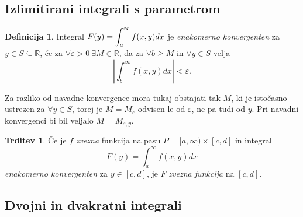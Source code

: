 \documentclass[11pt]{article}
\theoremstyle{definition}
\newtheorem{definicija}{Definicija}[section]
\theoremstyle{definition}
\newtheorem{trditev}{Trditev}[section]
\theoremstyle{definition}
\begin{document}

\subsection{Izlimitirani integrali s parametrom}
\vspace{0.5cm}

\begin{definicija}

Integral $F(y) = \mathlarger{\int_{a}^{\infty} f(x, y) dx}$ je \textit{enakomerno konvergenten} za $y \in S \subseteq \mathbb{R}$, če za $\forall \varepsilon > 0 ~\exists M \in \mathbb{R}$, da za $\forall b \geq M$ in $\forall y \in S$ velja
$$\left| \int_{b}^{\infty} f(x, y) dx \right| < \varepsilon.$$ 

Za razliko od navadne konvergence mora tukaj obstajati tak $M$, ki je istočasno ustrezen za $\forall y \in S$, torej je $M = M_{\varepsilon}$ odvisen le od $\varepsilon$, ne pa tudi od $y$. Pri navadni konvergenci bi bil veljalo $M = M_{\varepsilon,y}$.

\end{definicija}
\vspace{0.5cm}

\begin{trditev}

Če je $f$ \textit{zvezna} funkcija na pasu $P = [a, \infty) \times [c, d]$ in integral
$$F(y) = \int_{a}^{\infty} f(x, y) dx$$
\textit{enakomerno konvergenten} za $y \in [c, d]$, je $F$ \textit{zvezna funkcija} na $[c, d]$.

\end{trditev}
\vspace{0.5cm}


\subsection{Dvojni in dvakratni integrali}
\vspace{0.5cm}
\end{document}
